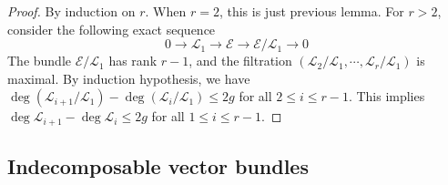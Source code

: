 \documentclass{ctexart}
\begin{document}
\begin{proof}
    By induction on $r$.
    When $r = 2$, this is just previous lemma.
    For $r > 2$, consider the following exact sequence
    \begin{equation}
        0 \longrightarrow \mathcal{L}_{1} \longrightarrow \mathcal{E} \longrightarrow \mathcal{E}/\mathcal{L}_{1} \longrightarrow 0
    \end{equation}
    The bundle $\mathcal{E}/\mathcal{L}_{1}$ has rank $r - 1$, and the filtration $(\mathcal{L}_{2}/\mathcal{L}_{1}, \cdots, \mathcal{L}_{r}/\mathcal{L}_{1})$ is maximal.
    By induction hypothesis, we have $\deg (\mathcal{L}_{i + 1}/\mathcal{L}_{1}) - \deg (\mathcal{L}_{i}/\mathcal{L}_{1}) \le 2g$ for all $2 \le i \le r - 1$.
    This implies $\deg \mathcal{L}_{i + 1} - \deg \mathcal{L}_{i} \le 2g$ for all $1 \le i \le r - 1$.
\end{proof}

\subsection{Indecomposable vector bundles}
\label{subsection:Vector_Bundles_on_Curves_Indecomposable_vector_bundles}
\end{document}
